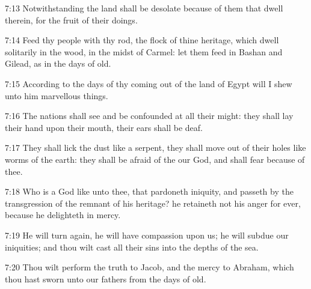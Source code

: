7:13 Notwithstanding the land shall be desolate because of them that dwell therein, for the fruit of their doings.

7:14 Feed thy people with thy rod, the flock of thine heritage, which dwell solitarily in the wood, in the midst of Carmel: let them feed in Bashan and Gilead, as in the days of old.

7:15 According to the days of thy coming out of the land of Egypt will I shew unto him marvellous things.

7:16 The nations shall see and be confounded at all their might: they shall lay their hand upon their mouth, their ears shall be deaf.

7:17 They shall lick the dust like a serpent, they shall move out of their holes like worms of the earth: they shall be afraid of the \LORD our God, and shall fear because of thee.

7:18 Who is a God like unto thee, that pardoneth iniquity, and passeth by the transgression of the remnant of his heritage? he retaineth not his anger for ever, because he delighteth in mercy.

7:19 He will turn again, he will have compassion upon us; he will subdue our iniquities; and thou wilt cast all their sins into the depths of the sea.

7:20 Thou wilt perform the truth to Jacob, and the mercy to Abraham, which thou hast sworn unto our fathers from the days of old.

